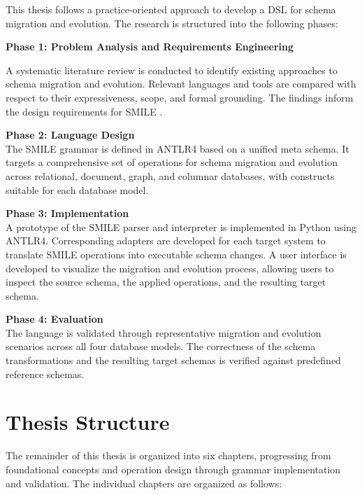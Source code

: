 This thesis follows a practice-oriented approach to develop
a DSL for schema migration and evolution. The research is structured
into the following phases:

\textbf{Phase 1: Problem Analysis and Requirements Engineering}

A systematic literature review is conducted to identify existing approaches to schema migration and evolution. Relevant languages and tools are compared with respect to their expressiveness, scope, and formal grounding. The findings inform the design requirements for SMILE .

\textbf{Phase 2: Language Design}\\
The SMILE  grammar is defined in ANTLR4 based on a unified meta schema. It targets a comprehensive set of operations for schema migration and evolution across relational, document, graph, and columnar databases, with constructs suitable for each database model.

\textbf{Phase 3: Implementation}\\
A prototype of the SMILE  parser and interpreter is implemented in Python using ANTLR4. Corresponding adapters are developed for each target system to translate SMILE  operations into executable schema changes. A user interface is developed to visualize the migration and evolution process, allowing users to inspect the source schema, the applied operations, and the resulting target schema.

\textbf{Phase 4: Evaluation}\\
The language is validated through representative migration and evolution scenarios across all four database models. The correctness of the schema transformations and the resulting target schemas is verified against predefined reference schemas.


\section{Thesis Structure}
The remainder of this thesis is organized into six chapters, progressing from foundational concepts and operation design through grammar implementation and validation. The individual chapters are organized as follows:

